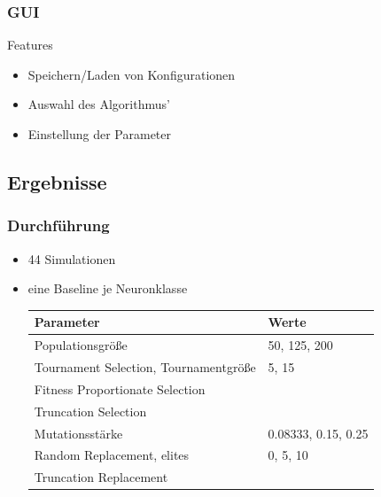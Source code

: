 \begin{frame}
  \frametitle{GUI}
  \begin{block}{Features}
    \begin{itemize}
    \item Speichern/Laden von Konfigurationen
    \item Auswahl des Algorithmus'
    \item Einstellung der Parameter
    \end{itemize}
  \end{block}
\end{frame}

\subsection{Ergebnisse}

\begin{frame}
  \frametitle{Durchführung}
  \begin{itemize}
  \item 44 Simulationen
  \item eine Baseline je Neuronklasse
    \scriptsize
    \begin{tabular}[H]{ll}
      Parameter & Werte \\\hline
      Populationsgröße & 50, 125, 200 \\ \arrayrulecolor{light-gray}\hline
      Tournament Selection, Tournamentgröße & 5, 15 \\
      Fitness Proportionate Selection & \\
      Truncation Selection  & \\ \hline
      Mutationsstärke & 0.08333, 0.15, 0.25 \\ \hline
      Random Replacement, elites & 0, 5, 10 \\
      Truncation Replacement & \\
    \end{tabular}
  \end{itemize}
\end{frame}


